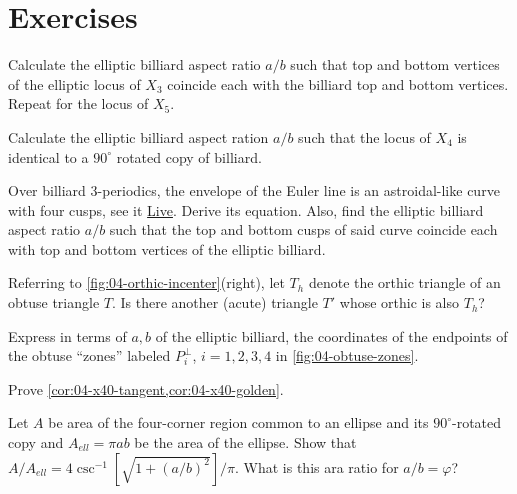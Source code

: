 \section{Exercises}

\begin{exercise}
Calculate the elliptic billiard aspect ratio $a/b$ such that top and bottom vertices of the elliptic locus of $X_3$ coincide each with the billiard top and bottom vertices. Repeat for the locus of $X_5$.
\end{exercise}

\begin{exercise}
Calculate the elliptic billiard aspect ration $a/b$ such that the locus of $X_4$ is identical to a $90^\circ$ rotated copy of billiard.
\end{exercise}

\begin{exercise}
Over billiard 3-periodics, the envelope of the Euler line is an astroidal-like curve with four cusps, see it \href{https://bit.ly/3yiCvrn}{Live}. Derive its equation. Also, find the elliptic billiard aspect ratio $a/b$ such that the top and bottom cusps of said curve coincide each with top and bottom vertices of the elliptic billiard.
\end{exercise}

\begin{exercise}
Referring to  \cref{fig:04-orthic-incenter}(right), let $T_h$ denote the orthic triangle of an obtuse triangle $T$. Is there another (acute) triangle $T'$ whose orthic is also $T_h$?
\end{exercise}

\begin{exercise}
Express in terms of $a,b$ of the elliptic billiard, the coordinates of the endpoints of the obtuse ``zones'' labeled $P_i^{\perp}$, $i=1,2,3,4$ in  \cref{fig:04-obtuse-zones}.
\end{exercise}

\begin{exercise}
Prove \cref{cor:04-x40-tangent,cor:04-x40-golden}.
\end{exercise}

\begin{exercise}
Let $A$ be area of the four-corner region common to an ellipse and its $90^\circ$-rotated copy and $A_{ell}=\pi a b$ be the area of the ellipse. Show that $A/A_{ell}=4 \csc^{-1}\left[{\sqrt{1 + (a/b)^2}}\right]/\pi$. What is this ara ratio for $a/b=\varphi$?
\end{exercise}

